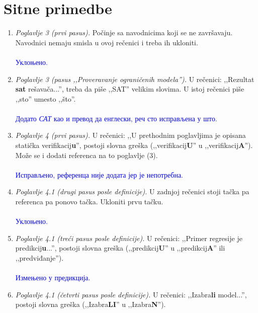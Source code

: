 \documentclass[a4paper]{report}
\newcommand{\odgovor}[1]{\textcolor{blue}{#1}}
\begin{document}
\section{Sitne primedbe}
\begin{enumerate}
	\item \textit{Poglavlje 3 (prvi pasus).} Počinje sa navodnicima koji se ne završavaju. Navodnici nemaju smisla u ovoj rečenici i treba ih ukloniti.
    \\\\
    \odgovor{Уклоњено.} 
	\\
    \item \textit{Poglavlje 3 (pasus ,,Proveravanje ograničenih modela'').} U rečenici: ,,Rezultat \textbf{sat} rešavača...'', treba da piše ,,SAT'' velikim slovima. U istoj rečenici piše ,,sto'' umesto ,,što''.
    \\\\
    \odgovor{Додато \emph{САТ} као и превод да енглески, реч сто исправљена у што.} 
	\\
	\item \textit{Poglavlje 4 (prvi pasus).} U rečenici: ,,U prethodnim poglavljima je opisana statička verifikacij\textbf{u}'', postoji slovna greška (,,verifikacij\textbf{U}'' u ,,verifikacij\textbf{A}''). Može se i dodati referenca na to poglavlje (3).
    \\\\
    \odgovor{Исправљено, референца није додата јер је непотребна.} 
	\\
	\item \textit{Poglavlje 4.1 (drugi pasus posle definicije).} U zadnjoj rečenici stoji tačka pa referenca pa ponovo tačka. Ukloniti prvu tačku.
    \\\\
    \odgovor{Уклоњено.} 
	\\
	\item \textit{Poglavlje 4.1 (treći pasus posle definicije).} U rečenici: ,,Primer regresije je predikcij\textbf{u}...'', postoji slovna greška (,,predikcij\textbf{U}'' u ,,predikcij\textbf{A}'' ili ,,predviđanje'').
    \\\\
    \odgovor{Измењено у предикција.} 
	\\
	\item \textit{Poglavlje 4.1 (četvrti pasus posle definicije).} U rečenici: ,,Izabra\textbf{li} model...'', postoji slovna greška (,,Izabra\textbf{LI}'' u ,,Izabra\textbf{N}'').

\end{enumerate}
\end{document}
